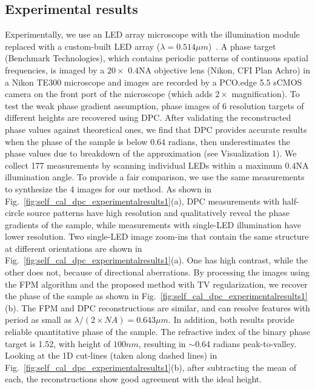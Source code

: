 \subsection{Experimental results}

Experimentally, we use an LED array microscope with the illumination module replaced with a custom-built LED array ($\lambda = 0.514\mu m$)~\cite{tian2015quantitative, tian2015computational}. A phase target (Benchmark Technologies), which contains periodic patterns of continuous spatial frequencies, is imaged by a $20\times$ $0.4 \mathrm{NA}$ objective lens (Nikon, CFI Plan Achro) in a Nikon TE300 microscope and images are recorded by a PCO.edge 5.5 sCMOS camera on the front port of the microscope (which adds $2\times$ magnification). To test the weak phase gradient assumption, phase images of 6 resolution targets of different heights are recovered using DPC. After validating the reconstructed phase values against theoretical ones, we find that DPC provides accurate results when the phase of the sample is below $0.64$ radians, then underestimates the phase values due to breakdown of the approximation (see Visualization 1). We collect 177 measurements by scanning individual LEDs within a maximum $0.4 \mathrm{NA}$ illumination angle. To provide a fair comparison, we use the same measurements to synthesize the 4 images for our method. As shown in Fig.~\ref{fig:self_cal_dpc_experimentalresults1}(a), DPC measurements with half-circle source patterns have high resolution and qualitatively reveal the phase gradients of the sample, while measurements with single-LED illumination have lower resolution. Two single-LED image zoom-ins that contain the same structure at different orientations are shown in Fig.~\ref{fig:self_cal_dpc_experimentalresults1}(a). One has high contrast, while the other does not, because of directional aberrations. By processing the images using the FPM algorithm and the proposed method with TV regularization, we recover the phase of the sample as shown in Fig.~\ref{fig:self_cal_dpc_experimentalresults1}(b). The FPM and DPC reconstructions are similar, and can resolve features with period as small as $\lambda/\left(2\times NA\right) = 0.643\mu m$. In addition, both results provide reliable quantitative phase of the sample. The refractive index of the binary phase target is 1.52, with height of $100 nm$, resulting in $\sim$0.64 radians peak-to-valley. Looking at the 1D cut-lines (taken along dashed lines) in Fig.~\ref{fig:self_cal_dpc_experimentalresults1}(b), after subtracting the mean of each, the reconstructions show good agreement with the ideal height.


